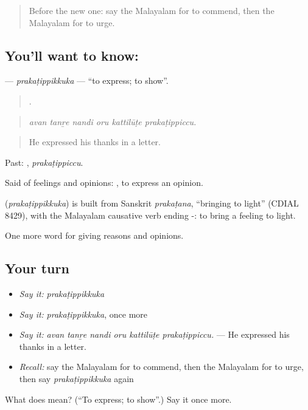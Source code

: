 \begin{quote}
Before the new one: say the Malayalam for to commend, then the Malayalam for to urge.
\end{quote}

\subsection*{You'll want to know: }
\textbf{} — \emph{prakaṭippikkuka} — \textquotedblleft{}to express; to show\textquotedblright{}.

\begin{quote}
     .
\end{quote}

\begin{quote}
\emph{avan tanṟe nandi oru kattilūṭe prakaṭippiccu.}
\end{quote}

\begin{quote}
He expressed his thanks in a letter.
\end{quote}

Past: , \emph{prakaṭippiccu}.

Said of feelings and opinions:  , to express an opinion.

\begin{cousinweb}
\textbf{} (\emph{prakaṭippikkuka}) is built from Sanskrit \emph{prakaṭana}, \textquotedblleft{}bringing to light\textquotedblright{} (CDIAL 8429), with the Malayalam causative verb ending -: to bring a feeling to light.
\end{cousinweb}

\begin{grammarlens}[title={What you've built}]
One more word for giving reasons and opinions.
\end{grammarlens}

\subsection*{Your turn}
\begin{itemize}
\raggedright
  \item \emph{Say it:} \emph{prakaṭippikkuka}
  \item \emph{Say it:} \emph{prakaṭippikkuka}, once more
  \item \emph{Say it:} \emph{avan tanṟe nandi oru kattilūṭe prakaṭippiccu.} — He expressed his thanks in a letter.
  \item \emph{Recall:} say the Malayalam for to commend, then the Malayalam for to urge, then say \emph{prakaṭippikkuka} again
\end{itemize}

\begin{tcolorbox}[breakable,colback=teal!4,colframe=teal!35!black,title={Before you move on}]
What does  mean? (\textquotedblleft{}To express; to show\textquotedblright{}.) Say it once more.
\end{tcolorbox}
